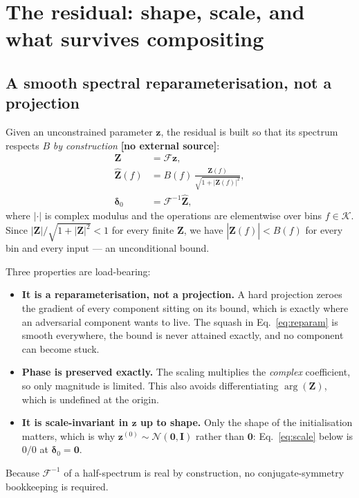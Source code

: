 \documentclass[11pt,a4paper]{article}
\newcommand{\novel}{\textbf{[no external source]}}
\begin{document}
\section{The residual: shape, scale, and what survives compositing}

\subsection{A smooth spectral reparameterisation, not a projection}

Given an unconstrained parameter $\mathbf{z}$, the residual is built so that
its spectrum respects $B$ \emph{by construction} \novel{}:
\begin{align}
  \mathbf{Z} &= \mathcal{F}\mathbf{z}, \label{eq:Z}\\
  \widehat{\mathbf{Z}}(f) &= B(f)\,
     \frac{\mathbf{Z}(f)}{\sqrt{1+|\mathbf{Z}(f)|^2}}, \label{eq:reparam}\\
  \boldsymbol{\delta}_0 &= \mathcal{F}^{-1}\widehat{\mathbf{Z}},
  \label{eq:delta0}
\end{align}
where $|\cdot|$ is complex modulus and the operations are elementwise over
bins $f\in\mathcal{K}$. Since $|\mathbf{Z}|/\sqrt{1+|\mathbf{Z}|^2}<1$ for
every finite $\mathbf{Z}$, we have $|\widehat{\mathbf{Z}}(f)|<B(f)$ for every
bin and every input --- an unconditional bound.

Three properties are load-bearing:
\begin{itemize}
\item \textbf{It is a reparameterisation, not a projection.} A hard
  projection zeroes the gradient of every component sitting on its bound,
  which is exactly where an adversarial component wants to live. The squash
  in Eq.~\eqref{eq:reparam} is smooth everywhere, the bound is never
  attained exactly, and no component can become stuck.
\item \textbf{Phase is preserved exactly.} The scaling multiplies the
  \emph{complex} coefficient, so only magnitude is limited. This also avoids
  differentiating $\arg(\mathbf{Z})$, which is undefined at the origin.
\item \textbf{It is scale-invariant in $\mathbf{z}$ up to shape.} Only the
  shape of the initialisation matters, which is why
  $\mathbf{z}^{(0)}\sim\mathcal{N}(\mathbf{0},\mathbf{I})$ rather than
  $\mathbf{0}$: Eq.~\eqref{eq:scale} below is $0/0$ at
  $\boldsymbol{\delta}_0=\mathbf{0}$.
\end{itemize}
Because $\mathcal{F}^{-1}$ of a half-spectrum is real by construction, no
conjugate-symmetry bookkeeping is required.
\end{document}
